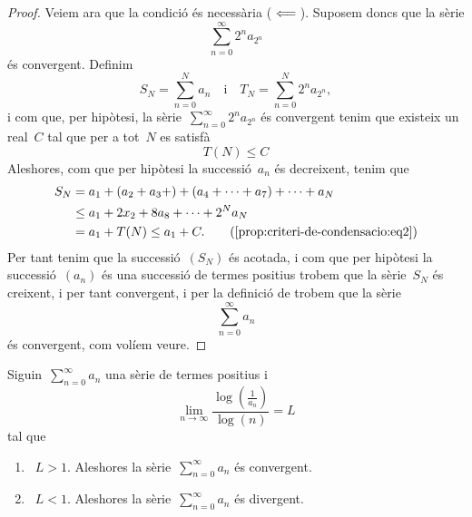 \documentclass[../analisi-matematica.tex]{subfiles}
\begin{document}
\begin{proof}
        Veiem ara que la condició és necessària (\(\impliedby\)).
        Suposem doncs que la sèrie
        \[
            \sum_{n=0}^{\infty}2^{n}a_{2^{n}}
        \]
        és convergent.
        Definim
        \[
            S_{N}=\sum_{n=0}^{N}a_{n}\quad\text{i}\quad T_{N}=\sum_{n=0}^{N}2^{n}a_{2^{n}},
        \]
        i com que, per hipòtesi, la sèrie~\(\sum_{n=0}^{\infty}2^{n}a_{2^{n}}\) és convergent tenim que existeix un real~\(C\) tal que per a tot~\(N\) es satisfà
        \begin{equation}
            \label{prop:criteri-de-condensacio:eq2}
            T(N)\leq C
        \end{equation}
        Aleshores, com que per hipòtesi la successió~\(a_{n}\) és decreixent, tenim que
        \begin{align*}
            S_{N}&=a_{1}+(a_{2}+a_{3}+)+(a_{4}+\dots+a_{7})+\dots+a_{N} \\
            &\leq a_{1}+2x_{2}+8a_{8}+\dots+2^{N}a_{N} \\
            &=a_{1}+T(N)\leq a_{1}+C.\tag{\ref{prop:criteri-de-condensacio:eq2}}
        \end{align*}
        Per tant tenim que la successió~\((S_{N})\) és acotada, i com que per hipòtesi la successió~\((a_{n})\) és una successió de termes positius trobem que la sèrie~\(S_{N}\) és creixent, i per tant convergent, %
        i per la definició de  trobem que la sèrie
        \[
            \sum_{n=0}^{\infty}a_{n}
        \]
        és convergent, com volíem veure.
    \end{proof}
    \begin{proposition}
        \label{prop:criteri-logaritmic}
        Siguin~\(\sum_{n=0}^{\infty}a_{n}\) una sèrie de termes positius i
        \[
            \lim_{n\to\infty}\frac{\log\left(\frac{1}{a_{n}}\right)}{\log(n)}=L
        \]
        tal que
        \begin{enumerate}
            \item\label{prop:criteri-logaritmic:enum1}~\(L>1\).
            Aleshores la sèrie~\(\sum_{n=0}^{\infty}a_{n}\) és convergent.
            \item\label{prop:criteri-logaritmic:enum2}~\(L<1\).
            Aleshores la sèrie~\(\sum_{n=0}^{\infty}a_{n}\) és divergent.
        \end{enumerate}
    \end{proposition}
\end{document}
